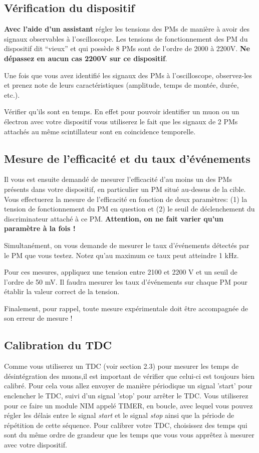 \subsection{Vérification du dispositif}
\textbf{Avec l'aide d'un assistant} régler les tensions des PMs de manière à 
avoir des signaux observables \`a l'oscilloscope. Les tensions de fonctionnement des PM du dispositif dit ``vieux'' et qui possède 8 PMs sont de l'ordre de 2000 à 2200V. \textbf{Ne dépassez en aucun cas 2200V sur ce dispositif}.

Une fois que vous avez identifi\'e les signaux des PMs à l'oscilloscope, observez-les et prenez note de leurs caract\'eristiques (amplitude, temps de 
mont\'ee, dur\'ee, etc.).

Vérifier qu'ils sont en temps. En effet pour pouvoir identifier un muon ou un \'electron
avec votre dispositif vous utiliserez le fait que les signaux de
2 PMs attach\'es au m\^eme scintillateur sont en coincidence temporelle.

\subsection{Mesure de l'efficacité et du taux d'événements}

Il vous est ensuite demandé de mesurer l'efficacité d'au moins un des PMs 
présents dans votre dispositif, en particulier un PM situ\'e au-dessus de la 
cible. Vous effectuerez la mesure de l'efficacité en fonction de deux paramètres: (1) la tension de fonctionnement du PM en question et (2) le seuil de 
déclenchement du discriminateur attaché à ce PM.
\textbf{Attention, on ne fait varier qu'un paramètre à la fois !}

Simultanément, on vous demande de mesurer le taux d'événements détectés par le 
PM que vous testez. Notez qu'au maximum ce taux peut atteindre 1 kHz.

Pour ces mesures, appliquez une tension entre 2100 et 2200 V et un seuil de l’ordre de 50 mV. Il faudra mesurer les taux d'événements sur chaque PM pour établir la valeur correct de la tension.

Finalement, pour rappel, toute mesure expérimentale doit être accompagnée de son erreur de mesure !

\subsection{Calibration du TDC}
Comme vous utiliserez un TDC (voir section 2.3) pour mesurer les temps de désintégration des muons,il est important de vérifier que celui-ci est toujours bien calibré. Pour cela vous 
allez envoyer de manière périodique un signal 'start' pour enclencher le TDC, suivi d'un signal 'stop' pour arrêter le TDC. Vous utiliserez pour ce faire un module NIM appelé TIMER, en boucle, avec lequel vous pouvez régler les délais entre
le signal \textit{start} et le signal \textit{stop} ainsi que la période de répétition de cette séquence.
Pour calibrer votre TDC, choisissez des temps qui sont du même ordre de grandeur 
que les temps que vous vous apprêtez à mesurer avec votre dispositif.

